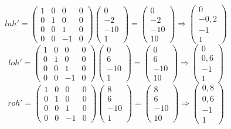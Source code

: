 \documentclass{article}
\begin{document}
\[
luh' = \begin{pmatrix}
        1&0&0&0\\
        0&1&0&0\\
        0&0&1&0\\
        0&0&-1&0
\end{pmatrix}
\begin{pmatrix}
        0\\-2\\-10\\1
\end{pmatrix}
=
\begin{pmatrix}
 0\\-2\\-10\\10
\end{pmatrix}
\Rightarrow
\begin{pmatrix}
 0\\-0,2\\-1\\1
\end{pmatrix}
\]
\[
loh' = \begin{pmatrix}
        1&0&0&0\\
        0&1&0&0\\
        0&0&1&0\\
        0&0&-1&0
\end{pmatrix}
\begin{pmatrix}
        0\\6\\-10\\1
\end{pmatrix}
=
\begin{pmatrix}
 0\\6\\-10\\10
\end{pmatrix}
\Rightarrow
\begin{pmatrix}
 0\\0,6\\-1\\1
\end{pmatrix}
\]
\[
roh' = \begin{pmatrix}
        1&0&0&0\\
        0&1&0&0\\
        0&0&1&0\\
        0&0&-1&0
\end{pmatrix}
\begin{pmatrix}
        8\\6\\-10\\1
\end{pmatrix}
=
\begin{pmatrix}
 8\\6\\-10\\10
\end{pmatrix}
\Rightarrow
\begin{pmatrix}
 0,8\\0,6\\-1\\1
\end{pmatrix}
\]
\end{document}
